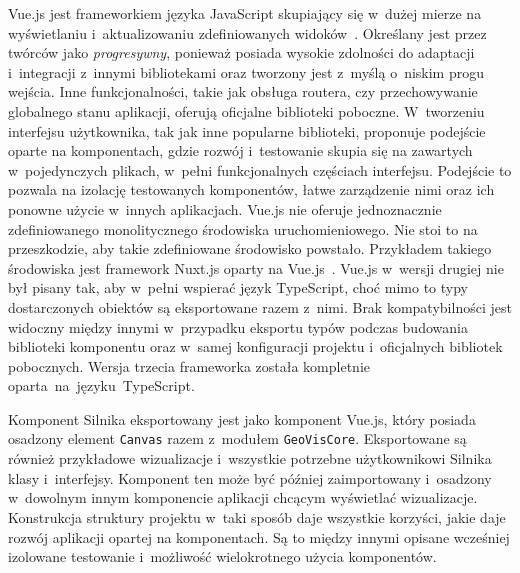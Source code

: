 Vue.js jest frameworkiem języka JavaScript skupiający się w~dużej mierze na wyświetlaniu i~aktualizowaniu zdefiniowanych widoków~\cite{Vue}. Określany jest przez twórców jako \textit{progresywny}, ponieważ posiada wysokie zdolności do adaptacji i~integracji z~innymi bibliotekami oraz tworzony jest z~myślą o~niskim progu wejścia. Inne funkcjonalności, takie jak obsługa routera, czy przechowywanie globalnego stanu aplikacji, oferują oficjalne biblioteki poboczne. W~tworzeniu interfejsu użytkownika, tak jak inne popularne biblioteki, proponuje podejście oparte na komponentach, gdzie rozwój i~testowanie skupia się na zawartych w~pojedynczych plikach, w~pełni funkcjonalnych częściach interfejsu. Podejście to pozwala na izolację testowanych komponentów, łatwe zarządzenie nimi oraz ich ponowne użycie w~innych aplikacjach. Vue.js nie oferuje jednoznacznie zdefiniowanego monolitycznego środowiska uruchomieniowego. Nie stoi to na przeszkodzie, aby takie zdefiniowane środowisko powstało. Przykładem takiego środowiska jest framework Nuxt.js oparty na Vue.js~\cite{Nuxt}. Vue.js w~wersji drugiej nie był pisany tak, aby w~pełni wspierać język TypeScript, choć mimo to typy dostarczonych obiektów są eksportowane razem z~nimi. Brak kompatybilności jest widoczny między innymi w~przypadku eksportu typów podczas budowania biblioteki komponentu oraz w~samej konfiguracji projektu i~oficjalnych bibliotek pobocznych. Wersja trzecia frameworka została kompletnie \mbox{oparta na języku TypeScript.}

Komponent Silnika eksportowany jest jako komponent Vue.js, który posiada osadzony element \texttt{Canvas} razem z~modułem \texttt{GeoVisCore}. Eksportowane są również przykładowe wizualizacje i~wszystkie potrzebne użytkownikowi Silnika klasy i~interfejsy. Komponent ten może być później zaimportowany i~osadzony w~dowolnym innym komponencie aplikacji chcącym wyświetlać wizualizacje. Konstrukcja struktury projektu w~taki sposób daje wszystkie korzyści, jakie daje rozwój aplikacji opartej na komponentach. Są to między innymi opisane wcześniej izolowane testowanie i~możliwość wielokrotnego użycia komponentów. 

